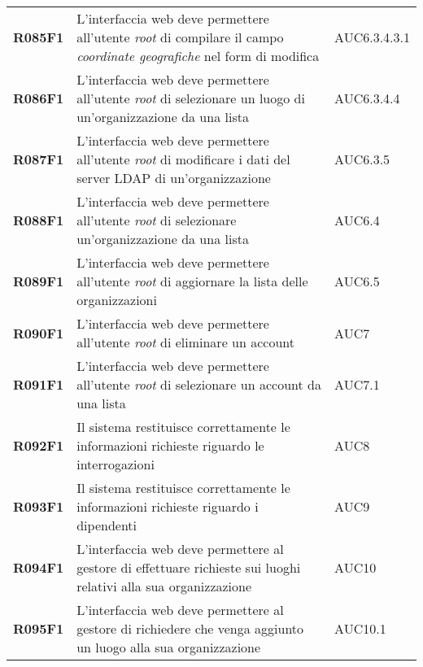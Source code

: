 \documentclass[../analisi-dei-requisiti]{subfiles}
\begin{document}
\begin{longtable}[H]{>{\centering\bfseries}m{3cm} >{\centering}m{10cm} >{\centering\arraybackslash}m{3cm}}
  R085F1                  & L'interfaccia web deve permettere all'utente \textit{root} di compilare il campo \textit{coordinate geografiche} nel form di modifica          & AUC6.3.4.3.1                  \\
  R086F1                  & L'interfaccia web deve permettere all'utente \textit{root} di selezionare un luogo di un'organizzazione da una lista                           & AUC6.3.4.4                    \\
  R087F1                  & L'interfaccia web deve permettere all'utente \textit{root} di modificare i dati del server LDAP di un'organizzazione                           & AUC6.3.5                      \\
  R088F1                  & L'interfaccia web deve permettere all'utente \textit{root} di selezionare un'organizzazione da una lista                                       & AUC6.4                        \\
  R089F1                  & L'interfaccia web deve permettere all'utente \textit{root} di aggiornare la lista delle organizzazioni                                         & AUC6.5                        \\
  R090F1                  & L'interfaccia web deve permettere all'utente \textit{root} di eliminare un account                                                             & AUC7                          \\
  R091F1                  & L'interfaccia web deve permettere all'utente \textit{root} di selezionare un account da una lista                                              & AUC7.1                        \\
  R092F1                  & Il sistema restituisce correttamente le informazioni richieste riguardo le interrogazioni                                                      & AUC8                          \\
  R093F1                  & Il sistema restituisce correttamente le informazioni richieste riguardo i dipendenti                                                           & AUC9                          \\
  R094F1                  & L'interfaccia web deve permettere al gestore di effettuare richieste sui luoghi relativi alla sua organizzazione                                                         & AUC10                         \\
  R095F1                  & L'interfaccia web deve permettere al gestore di richiedere che venga aggiunto un luogo alla sua organizzazione                                 & AUC10.1                       \\

\end{longtable}
\end{document}
